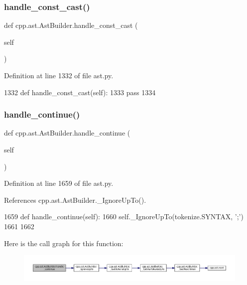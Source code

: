 \subsubsection{\texorpdfstring{handle\+\_\+const\+\_\+cast()}{handle\_const\_cast()}}
{\footnotesize\ttfamily def cpp.\+ast.\+Ast\+Builder.\+handle\+\_\+const\+\_\+cast (\begin{DoxyParamCaption}\item[{}]{self }\end{DoxyParamCaption})}



Definition at line 1332 of file ast.\+py.


\begin{DoxyCode}
1332     \textcolor{keyword}{def }handle\_const\_cast(self):
1333         \textcolor{keywordflow}{pass}
1334 
\end{DoxyCode}
\mbox{\label{classcpp_1_1ast_1_1AstBuilder_a511eb003ed301a713a687e5293584077}} 
\subsubsection{\texorpdfstring{handle\+\_\+continue()}{handle\_continue()}}
{\footnotesize\ttfamily def cpp.\+ast.\+Ast\+Builder.\+handle\+\_\+continue (\begin{DoxyParamCaption}\item[{}]{self }\end{DoxyParamCaption})}



Definition at line 1659 of file ast.\+py.



References cpp.\+ast.\+Ast\+Builder.\+\_\+\+Ignore\+Up\+To().


\begin{DoxyCode}
1659     \textcolor{keyword}{def }handle\_continue(self):
1660         self.\_IgnoreUpTo(tokenize.SYNTAX, \textcolor{stringliteral}{';'})
1661 
1662 
\end{DoxyCode}
Here is the call graph for this function\+:
\nopagebreak
\begin{figure}[H]
\begin{center}
\leavevmode
\includegraphics[width=350pt]{classcpp_1_1ast_1_1AstBuilder_a511eb003ed301a713a687e5293584077_cgraph}
\end{center}
\end{figure}
\mbox{\label{classcpp_1_1ast_1_1AstBuilder_a6bf895d948d231ffcd058df7af05d0be}} 
